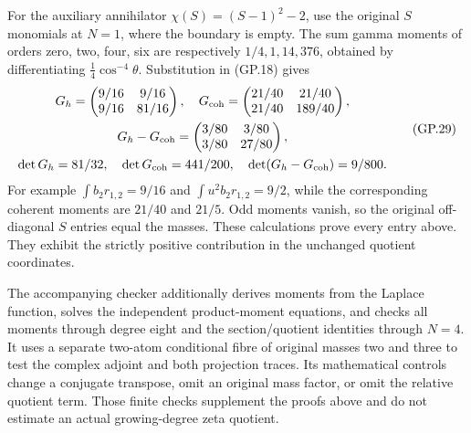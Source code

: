 For the auxiliary annihilator $\chi(S)=(S-1)^2-2$, use the original
$S$ monomials at $N=1$, where the boundary is empty. The sum gamma
moments of orders zero, two, four, six are respectively
$1/4,1,14,376$, obtained by differentiating
$\tfrac14\cos^{-4}\theta$. Substitution in (GP.18) gives
\begin{equation}
 \begin{gathered}
 G_h=\begin{pmatrix}9/16&9/16\\9/16&81/16\end{pmatrix},\quad
 G_{\rm coh}=\begin{pmatrix}21/40&21/40\\21/40&189/40\end{pmatrix},\\
 G_h-G_{\rm coh}=\begin{pmatrix}3/80&3/80\\3/80&27/80\end{pmatrix},\\
 \det G_h=81/32,\quad\det G_{\rm coh}=441/200,\quad
 \det(G_h-G_{\rm coh})=9/800.
 \end{gathered}
 \tag{GP.29}
\end{equation}
For example $\int b_2r_{1,2}=9/16$ and
$\int u^2b_2r_{1,2}=9/2$, while the corresponding coherent moments
are $21/40$ and $21/5$. Odd moments vanish, so the original
off-diagonal $S$ entries equal the masses. These calculations prove
every entry above. They exhibit the strictly positive contribution
in the unchanged quotient coordinates.

The accompanying checker additionally derives moments from the Laplace
function, solves the independent product-moment equations, and checks
all moments through degree eight and the section/quotient identities
through $N=4$. It uses a separate two-atom conditional fibre of original
masses two and three to test the complex adjoint and both projection
traces. Its mathematical controls change a conjugate transpose, omit
an original mass factor, or omit the relative quotient term. Those
finite checks supplement the proofs above and do not estimate an
actual growing-degree zeta quotient.

